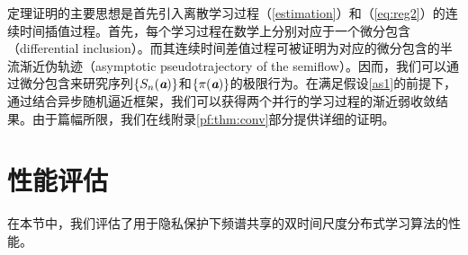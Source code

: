 定理证明的主要思想是首先引入离散学习过程（\ref{estimation}）和（\ref{eq:reg2}）的连续时间插值过程。首先，每个学习过程在数学上分别对应于一个微分包含（differential inclusion）\cite{Yin}。而其连续时间差值过程可被证明为对应的微分包含的半流渐近伪轨迹（asymptotic pseudotrajectory of the semiflow）。因而，我们可以通过微分包含来研究序列$\{S_n(\emph{\textbf{a}})\}$和$\{\pi(\emph{\textbf{a}})\}$的极限行为。在满足假设\ref{as1}的前提下，通过结合异步随机逼近框架\cite{Borkar1997}，我们可以获得两个并行的学习过程的渐近弱收敛结果。由于篇幅所限，我们在线附录\ref{pf:thm:conv}部分提供详细的证明。

\section{性能评估}\label{sec:simulation}
在本节中，我们评估了用于隐私保护下频谱共享的双时间尺度分布式学习算法的性能。
